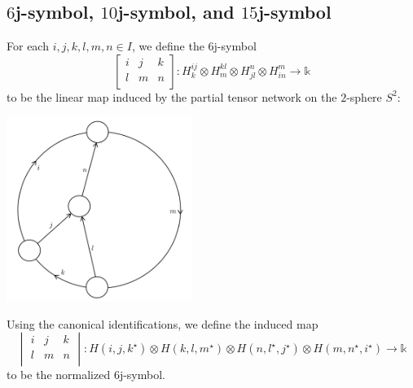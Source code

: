 \subsection{$6$j-symbol, $10$j-symbol, and $15$j-symbol}

\newcommand{\sixJSymbol}[6]{\begin{bmatrix}
  #1 & #2 & #3 \\
  #4 & #5 & #6 \\
\end{bmatrix}}

\newcommand{\normalizedSixJSymbol}[6]{\begin{vmatrix}
  #1 & #2 & #3 \\
  #4 & #5 & #6 \\
\end{vmatrix}}

\newcommand{\tenJSymbol}[8]{\begin{vmatrix}
    #1 & #2 & #3 & #4 \\
     * & #5 & #6 & #7 \\
    \tenJSymbolContinued #8 \\
  \end{vmatrix}_{10j}
}

\newcommand\tenJSymbolContinued[3]{
  * & * & #1 & #2 \\
  * & * & * & #3
}

\begin{definition}[$6$j-symbol]\label{def/6j-symbol}
  For each $i,j,k,l,m,n \in I$, we define the $6$j-symbol
  $$\sixJSymbol{i}{j}{k}{l}{m}{n}:
  H_{k}^{ij} \otimes H_{m}^{kl} \otimes H_{jl}^{n} \otimes H_{in}^{m} \to \mathbb{k}$$
  to be the linear map induced by the partial tensor network on
  the $2$-sphere $S^{2}$:
  \begin{center}
    \includegraphics[height=6cm]{6j-geometric}
  \end{center}

  \noindent Using the canonical identifications, we define the
  induced map
  $$\normalizedSixJSymbol{i}{j}{k}{l}{m}{n}: H(i,j,k^{\star}) \otimes H(k,l,m^{\star}) \otimes H(n,l^{\star},j^{\star}) \otimes H(m,n^{\star},i^{\star}) \to \mathbb{k}$$
  to be the normalized $6$j-symbol.
\end{definition}


